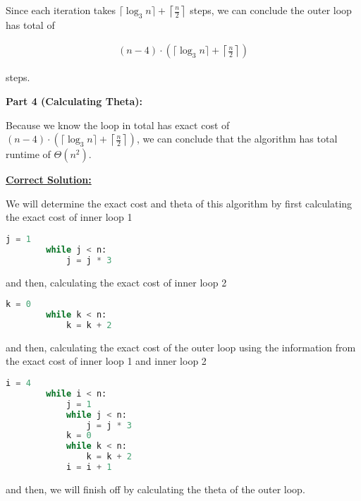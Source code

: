 \documentclass[12pt]{article}
\begin{document}
\begin{enumerate}[a.]
    Since each iteration takes $\lceil \log_3 n \rceil + \left\lceil \frac{n}{2} \right\rceil$
    steps, we can conclude the outer loop has total of

    \begin{align}
        (n-4) \cdot \left( \lceil \log_3 n \rceil + \left\lceil \frac{n}{2} \right\rceil \right)
    \end{align}

    steps.

    \bigskip

    \textbf{Part 4 (Calculating Theta):}

    \bigskip

    Because we know the loop in total has exact cost of $(n-4) \cdot \left( \lceil \log_3 n
    \rceil + \left\lceil \frac{n}{2} \right\rceil \right)$, we can conclude that
    the algorithm has total runtime of $\Theta(n^2)$.

    \bigskip

    \begin{mdframed}
        \underline{\textbf{Correct Solution:}}

        \bigskip

        We will determine the exact cost and theta of this algorithm by first
        calculating the exact cost of inner loop 1

        \begin{lstlisting}[language=Python]
        j = 1
        while j < n:
            j = j * 3
        \end{lstlisting}

        and then, calculating the exact cost of inner loop 2

        \begin{lstlisting}[language=Python]
        k = 0
        while k < n:
            k = k + 2
        \end{lstlisting}

        and then, calculating the exact cost of the outer loop using the information
        from the exact cost of inner loop 1 and inner loop 2

        \begin{lstlisting}[language=Python]
        i = 4
        while i < n:
            j = 1
            while j < n:
                j = j * 3
            k = 0
            while k < n:
                k = k + 2
            i = i + 1
        \end{lstlisting}

        and then, we will finish off by calculating the theta of the outer loop.


\end{mdframed}
\end{enumerate}
\end{document}
